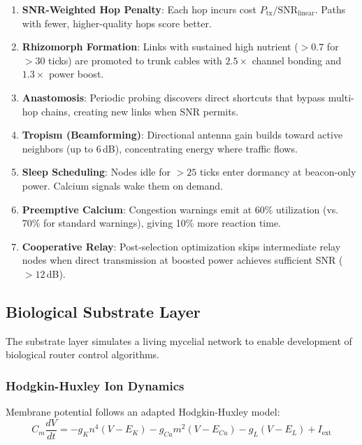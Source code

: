 \documentclass[conference,10pt]{IEEEtran}
\begin{document}
\begin{enumerate}
    \item \textbf{SNR-Weighted Hop Penalty}: Each hop incurs cost $P_{\text{tx}}/\text{SNR}_{\text{linear}}$. Paths with fewer, higher-quality hops score better.

    \item \textbf{Rhizomorph Formation}: Links with sustained high nutrient ($>0.7$ for $>30$ ticks) are promoted to trunk cables with $2.5\times$ channel bonding and $1.3\times$ power boost.

    \item \textbf{Anastomosis}: Periodic probing discovers direct shortcuts that bypass multi-hop chains, creating new links when SNR permits.

    \item \textbf{Tropism (Beamforming)}: Directional antenna gain builds toward active neighbors (up to 6\,dB), concentrating energy where traffic flows.

    \item \textbf{Sleep Scheduling}: Nodes idle for $>25$ ticks enter dormancy at beacon-only power. Calcium signals wake them on demand.

    \item \textbf{Preemptive Calcium}: Congestion warnings emit at 60\% utilization (vs. 70\% for standard warnings), giving 10\% more reaction time.

    \item \textbf{Cooperative Relay}: Post-selection optimization skips intermediate relay nodes when direct transmission at boosted power achieves sufficient SNR ($>12$\,dB).
\end{enumerate}

\subsection{Biological Substrate Layer}

The substrate layer simulates a living mycelial network to enable development of biological router control algorithms.

\subsubsection{Hodgkin-Huxley Ion Dynamics}

Membrane potential follows an adapted Hodgkin-Huxley model:
\begin{equation}
    C_m \frac{dV}{dt} = -g_K n^4 (V - E_K) - g_{Ca} m^2 (V - E_{Ca}) - g_L (V - E_L) + I_{\text{ext}}
\end{equation}
\end{document}
